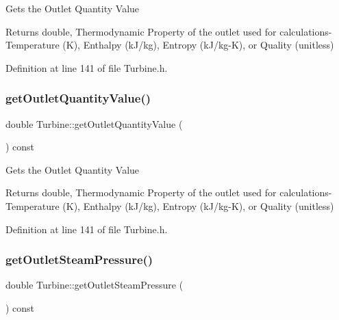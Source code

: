 Gets the Outlet Quantity Value

\begin{DoxyReturn}{Returns}
double, Thermodynamic Property of the outlet used for calculations-\/ Temperature (K), Enthalpy (k\+J/kg), Entropy (k\+J/kg-\/K), or Quality (unitless) 
\end{DoxyReturn}


Definition at line 141 of file Turbine.\+h.

\mbox{\label{class_turbine_aca98f128213e02e95dfd6f4b2ad8de4e}} 
\subsubsection{\texorpdfstring{get\+Outlet\+Quantity\+Value()}{getOutletQuantityValue()}\hspace{0.1cm}{\footnotesize\ttfamily [3/3]}}
{\footnotesize\ttfamily double Turbine\+::get\+Outlet\+Quantity\+Value (\begin{DoxyParamCaption}{ }\end{DoxyParamCaption}) const\hspace{0.3cm}{\ttfamily [inline]}}

Gets the Outlet Quantity Value

\begin{DoxyReturn}{Returns}
double, Thermodynamic Property of the outlet used for calculations-\/ Temperature (K), Enthalpy (k\+J/kg), Entropy (k\+J/kg-\/K), or Quality (unitless) 
\end{DoxyReturn}


Definition at line 141 of file Turbine.\+h.

\mbox{\label{class_turbine_a1589b2364a553db7aaa875bb543d171d}} 
\subsubsection{\texorpdfstring{get\+Outlet\+Steam\+Pressure()}{getOutletSteamPressure()}\hspace{0.1cm}{\footnotesize\ttfamily [1/3]}}
{\footnotesize\ttfamily double Turbine\+::get\+Outlet\+Steam\+Pressure (\begin{DoxyParamCaption}{ }\end{DoxyParamCaption}) const\hspace{0.3cm}{\ttfamily [inline]}}

